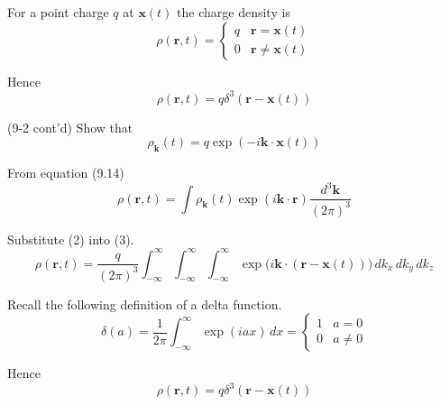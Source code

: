 


\bigskip
For a point charge $q$ at $\mathbf x(t)$ the charge density is
\begin{equation*}
\rho(\mathbf r,t)
=\begin{cases}
q & \mathbf r=\mathbf x(t)
\\
0 & \mathbf r\ne\mathbf x(t)
\end{cases}
\end{equation*}

Hence
\begin{equation*}
\rho(\mathbf r,t)=q\delta^3(\mathbf r-\mathbf x(t))
\tag{1}
\end{equation*}

(9-2 cont'd)
Show that
\begin{equation*}
\rho_{\mathbf k}(t)=q\exp(-i\mathbf k\cdot\mathbf x(t))
\tag{2}
\end{equation*}

From equation (9.14)
\begin{equation*}
\rho(\mathbf r,t)=\int\rho_{\mathbf k}(t)
\exp(i\mathbf k\cdot\mathbf r)
\frac{d^3\mathbf k}{(2\pi)^3}
\tag{3}
\end{equation*}

Substitute (2) into (3).
\begin{equation*}
\rho(\mathbf r,t)=\frac{q}{(2\pi)^3}
\int_{-\infty}^\infty
\int_{-\infty}^\infty
\int_{-\infty}^\infty
\exp\big(i\mathbf k\cdot(\mathbf r-\mathbf x(t))\big)
\,dk_x\,dk_y\,dk_z
\end{equation*}

Recall the following definition of a delta function.
\begin{equation*}
\delta(a)=\frac{1}{2\pi}\int_{-\infty}^\infty\exp(iax)\,dx
=\begin{cases}
1 & a=0
\\
0 & a\ne0
\end{cases}
\end{equation*}

Hence
\begin{equation*}
\rho(\mathbf r,t)=q\delta^3(\mathbf r-\mathbf x(t))
\end{equation*}

